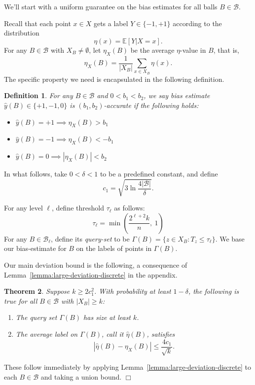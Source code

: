 \documentclass{article}
\def\E{{\mathbb E}}
\def\B{{\mathcal B}}
\def\yh{{\widehat{y}}}
\newtheorem{thm}{Theorem}
\newtheorem{defn}[thm]{Definition}
\newenvironment{proof}{\noindent {\sc Proof:}}{$\Box$ \medskip}
\begin{document}
We'll start with a uniform guarantee on the bias estimates for all balls $B \in \B$.

Recall that each point $x \in X$ gets a label $Y \in \{-1,+1\}$ according to the distribution
$$ \eta(x) = \E[Y | X=x].$$ 
For any $B \in \B$ with $X_B \neq \emptyset$, let $\eta_X(B)$ be the average $\eta$-value in $B$, that is,
$$ \eta_X(B) = \frac{1}{|X_B|} \sum_{x \in X_B} \eta(x) .$$
The specific property we need is encapsulated in the following definition.
\begin{defn}
For any $B \in \B$ and $0 < b_1 < b_2$, we say bias estimate $\yh(B) \in \{+1,-1,0\}$ is \emph{$(b_1,b_2)$-accurate} if the following holds:
\begin{itemize}
\item $\yh(B) = +1 \implies \eta_X(B) > b_1$
\item $\yh(B) = -1 \implies \eta_X(B) < -b_1$
\item $\yh(B) = 0 \implies |\eta_X(B)| < b_2$
\end{itemize}
\label{def:accurate-bias-estimate}
\end{defn}

In what follows, take $0 < \delta < 1$ to be a predefined constant, and define
\begin{equation}
c_1 = \sqrt{3 \ln \frac{4|\B|}{\delta}} .
\label{eq:c1}
\end{equation}

For any level $\ell$, define threshold $\tau_\ell$ as follows:
\begin{equation}
\tau_\ell = \min \left( \frac{2^{\ell+2}k}{n}, \ 1 \right)
\label{eq:threshold-ell}
\end{equation}
For any $B \in \B_\ell$, define its \emph{query-set} to be $\Gamma(B) = \{z \in X_B: T_z \leq \tau_\ell\}$. We base our bias-estimate for $B$ on the labels of points in $\Gamma(B)$.

Our main deviation bound is the following, a consequence of Lemma~\ref{lemma:large-deviation-discrete} in the appendix.
\begin{thm}
Suppose $k \geq 2c_1^2$. With probability at least $1-\delta$, the following is true for all $B \in \B$ with $|X_B| \geq k$:
\begin{enumerate}
\item[(a)] The query set $\Gamma(B)$ has size at least $k$.
\item[(b)] The average label on $\Gamma(B)$, call it $\widehat{\eta}(B)$, satisfies
$$ \left| \widehat{\eta}(B) - \eta_X(B) \right| \leq \frac{4c_1}{\sqrt{k}}.$$
\end{enumerate}
\label{thm:large-deviation-bounds}
\end{thm}
\begin{proof}
These follow immediately by applying Lemma~\ref{lemma:large-deviation-discrete} to each $B \in \B$ and taking a union bound. 
\end{proof}
\end{document}
